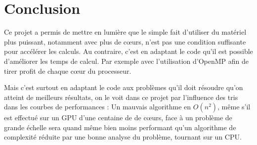 \section{Conclusion}

Ce projet a permis de mettre en lumière que le simple fait d'utiliser du matériel plus puissant, notamment avec plus de c\oe urs, n'est pas une condition suffisante pour accélérer les calculs. 
Au contraire, c'est en adaptant le code qu'il est possible d'améliorer les temps de calcul.
Par exemple avec l'utilisation d'OpenMP afin de tirer profit de chaque c\oe ur du processeur. 

Mais c'est surtout en adaptant le code aux problèmes qu'il doit résoudre qu'on atteint de meilleurs résultats, on le voit dans ce projet par l'influence des tris dans les courbes de performances : Un mauvais algorithme en $O(n^2)$, même s'il est effectué sur un GPU d'une centaine de de c\oe urs, face à un problème de grande échelle sera quand même bien moins performant qu'un algorithme de complexité réduite par une bonne analyse du problème, tournant sur un CPU.
